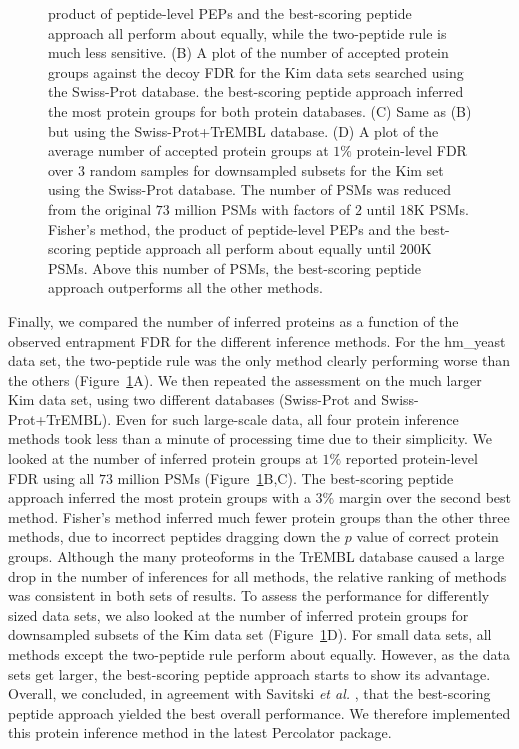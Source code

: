 \documentclass{article}
\begin{document}
\begin{figure}
{product of peptide-level PEPs and the best-scoring peptide approach
all perform about equally, while the two-peptide rule is much less
sensitive. (B) A plot of the number of accepted protein groups against
the decoy FDR for the Kim data sets searched using the Swiss-Prot
database. the best-scoring peptide approach inferred the most protein
groups for both protein databases. (C) Same as (B) but using the
Swiss-Prot+TrEMBL database. (D) A plot of the average number of
accepted protein groups at $1\%$ protein-level FDR over $3$ random
samples for downsampled subsets for the Kim set using the Swiss-Prot
database. The number of PSMs was reduced from the original $73$
million PSMs with factors of $2$ until $18$K PSMs. Fisher's method,
the product of peptide-level PEPs and the best-scoring peptide
approach all perform about equally until $200$K PSMs. Above this
number of PSMs, the best-scoring peptide approach outperforms all the
other methods.}
  \label{fig:power}
\end{figure}

Finally, we compared the number of inferred proteins as a function of
the observed entrapment FDR for the different inference methods.  For
the hm\_yeast data set, the two-peptide rule was the only method
clearly performing worse than the others (Figure~\ref{fig:power}A). We
then repeated the assessment on the much larger Kim data set, using
two different databases (Swiss-Prot and Swiss-Prot+TrEMBL).  Even for
such large-scale data, all four protein inference methods took less
than a minute of processing time due to their simplicity. We looked at
the number of inferred protein groups at $1\%$ reported protein-level
FDR using all $73$ million PSMs (Figure~\ref{fig:power}B,C).
The best-scoring peptide approach inferred the most protein groups
with a $3\%$ margin over the second best method. Fisher's method
inferred much fewer protein groups than the other three methods, due
to incorrect peptides dragging down the $p$ value of correct protein
groups.
Although the many proteoforms in the TrEMBL database caused a large
drop in the number of inferences for all methods, the relative ranking
of methods was consistent in both sets of results. To assess the
performance for differently sized data sets, we also looked at the
number of inferred protein groups for downsampled subsets of the Kim
data set (Figure~\ref{fig:power}D). For small data sets, all
methods except the two-peptide rule perform about equally. However, as
the data sets get larger, the best-scoring peptide approach starts to
show its advantage. Overall, we concluded, in agreement with Savitski
{\em et al.} \cite{savitski2015scalable}, that the best-scoring
peptide approach yielded the best overall performance. We therefore
implemented this protein inference method in the latest Percolator
package.
\end{document}
